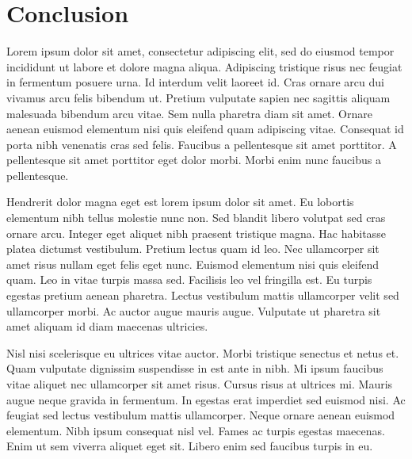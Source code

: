 \chapter{Conclusion}
Lorem ipsum dolor sit amet, consectetur adipiscing elit, sed do eiusmod tempor incididunt ut labore et dolore magna aliqua. Adipiscing tristique risus nec feugiat in fermentum posuere urna. Id interdum velit laoreet id. Cras ornare arcu dui vivamus arcu felis bibendum ut. Pretium vulputate sapien nec sagittis aliquam malesuada bibendum arcu vitae. Sem nulla pharetra diam sit amet. Ornare aenean euismod elementum nisi quis eleifend quam adipiscing vitae. Consequat id porta nibh venenatis cras sed felis. Faucibus a pellentesque sit amet porttitor. A pellentesque sit amet porttitor eget dolor morbi. Morbi enim nunc faucibus a pellentesque.

Hendrerit dolor magna eget est lorem ipsum dolor sit amet. Eu lobortis elementum nibh tellus molestie nunc non. Sed blandit libero volutpat sed cras ornare arcu. Integer eget aliquet nibh praesent tristique magna. Hac habitasse platea dictumst vestibulum. Pretium lectus quam id leo. Nec ullamcorper sit amet risus nullam eget felis eget nunc. Euismod elementum nisi quis eleifend quam. Leo in vitae turpis massa sed. Facilisis leo vel fringilla est. Eu turpis egestas pretium aenean pharetra. Lectus vestibulum mattis ullamcorper velit sed ullamcorper morbi. Ac auctor augue mauris augue. Vulputate ut pharetra sit amet aliquam id diam maecenas ultricies.

Nisl nisi scelerisque eu ultrices vitae auctor. Morbi tristique senectus et netus et. Quam vulputate dignissim suspendisse in est ante in nibh. Mi ipsum faucibus vitae aliquet nec ullamcorper sit amet risus. Cursus risus at ultrices mi. Mauris augue neque gravida in fermentum. In egestas erat imperdiet sed euismod nisi. Ac feugiat sed lectus vestibulum mattis ullamcorper. Neque ornare aenean euismod elementum. Nibh ipsum consequat nisl vel. Fames ac turpis egestas maecenas. Enim ut sem viverra aliquet eget sit. Libero enim sed faucibus turpis in eu.
